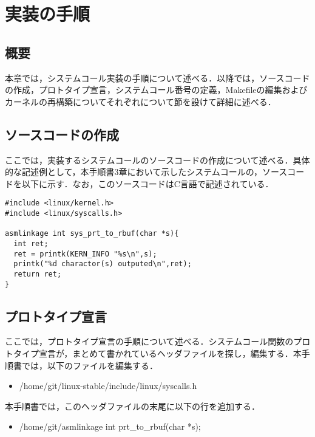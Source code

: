 \documentclass[12pt]{jsarticle}
\begin{document}
\section{実装の手順}
\subsection{概要}
本章では，システムコール実装の手順について述べる．以降では，ソースコードの作成，プロトタイプ宣言，システムコール番号の定義，Makefileの編集およびカーネルの再構築についてそれぞれについて節を設けて詳細に述べる．
\subsection{ソースコードの作成}
ここでは，実装するシステムコールのソースコードの作成について述べる．具体的な記述例として，本手順書3章において示したシステムコールの，ソースコードを以下に示す．なお，このソースコードはC言語で記述されている．
\begin{verbatim}
#include <linux/kernel.h>
#include <linux/syscalls.h>

asmlinkage int sys_prt_to_rbuf(char *s){
  int ret;
  ret = printk(KERN_INFO "%s\n",s);
  printk("%d charactor(s) outputed\n",ret);
  return ret;
}
\end{verbatim}
\subsection{プロトタイプ宣言}
ここでは，プロトタイプ宣言の手順について述べる．システムコール関数のプロトタイプ宣言が，まとめて書かれているヘッダファイルを探し，編集する．本手順書では，以下のファイルを編集する．
\begin{itemize}
\item \slash{}home\slash{}git\slash{}linux-stable\slash{}include\slash{}linux\slash{}syscalls.h
\end{itemize}
本手順書では，このヘッダファイルの末尾に以下の行を追加する．
\begin{itemize}
\item \slash{}home\slash{}git\slash{}asmlinkage int prt\_to\_rbuf(char *s);
\end{itemize}
\end{document}
